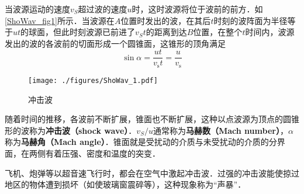 
当波源运动的速度$v_S$超过波的速度$u $时，这时波源将位于波前的前方．如\autoref{ShoWav_fig1}所示．当波源在$A $位置时发出的波，在其后$t $时刻的波阵面为半径等于$ut $的球面，但此时刻波源已前进了$v_St$的距离到达$B $位置，在整个$t $时间内，波源发出的波的各波前的切面形成一个圆锥面，这锥形的顶角满足
\begin{equation}
\sin \alpha=\frac{u t}{v_{\mathrm{s}} t}=\frac{u}{v_{\mathrm{s}}}
\end{equation}
\begin{figure}[ht]
\centering
\texttt{[image: ./figures/ShoWav\_1.pdf]}
\caption{冲击波} \label{ShoWav_fig1}
\end{figure}
随着时间的推移，各波前不断扩展，锥面也不断扩展，这种以点波源为顶点的圆锥形的波称为\textbf{冲击波（shock wave）}．$v_S/u$通常称为\textbf{马赫数（Mach number）}，$\alpha$称为\textbf{马赫角（Mach angle）}．锥面就是受扰动的介质与未受扰动的介质的分界面，在两侧有着压强、密度和温度的突变．

飞机、炮弹等以超音速飞行时，都会在空气中激起冲击波．过强的冲击波能使掠过地区的物体遭到损坏（如使玻璃窗震碎等），这种现象称为“声暴”．